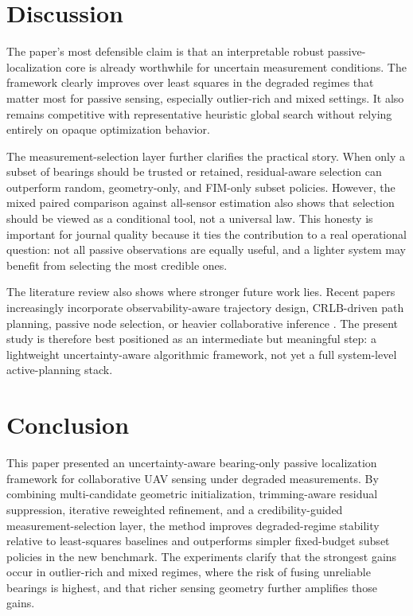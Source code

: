 \documentclass[preprint,12pt]{elsarticle}
\begin{document}


\section{Discussion}

The paper's most defensible claim is that an interpretable robust passive-localization core is already worthwhile for uncertain measurement conditions. The framework clearly improves over least squares in the degraded regimes that matter most for passive sensing, especially outlier-rich and mixed settings. It also remains competitive with representative heuristic global search without relying entirely on opaque optimization behavior.

The measurement-selection layer further clarifies the practical story. When only a subset of bearings should be trusted or retained, residual-aware selection can outperform random, geometry-only, and FIM-only subset policies. However, the mixed paired comparison against all-sensor estimation also shows that selection should be viewed as a conditional tool, not a universal law. This honesty is important for journal quality because it ties the contribution to a real operational question: not all passive observations are equally useful, and a lighter system may benefit from selecting the most credible ones.

The literature review also shows where stronger future work lies. Recent papers increasingly incorporate observability-aware trajectory design, CRLB-driven path planning, passive node selection, or heavier collaborative inference \cite{peng2024trajectory,chen2025variable,xing2025node,yang2024distributed,li2026formation}. The present study is therefore best positioned as an intermediate but meaningful step: a lightweight uncertainty-aware algorithmic framework, not yet a full system-level active-planning stack.

\section{Conclusion}

This paper presented an uncertainty-aware bearing-only passive localization framework for collaborative UAV sensing under degraded measurements. By combining multi-candidate geometric initialization, trimming-aware residual suppression, iterative reweighted refinement, and a credibility-guided measurement-selection layer, the method improves degraded-regime stability relative to least-squares baselines and outperforms simpler fixed-budget subset policies in the new benchmark. The experiments clarify that the strongest gains occur in outlier-rich and mixed regimes, where the risk of fusing unreliable bearings is highest, and that richer sensing geometry further amplifies those gains.
\end{document}
